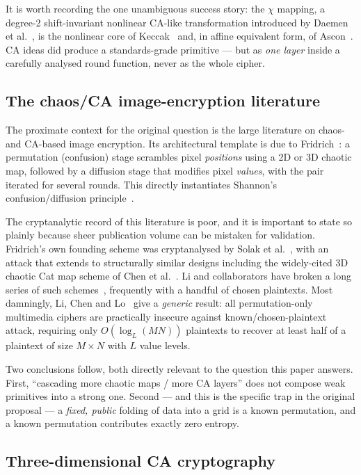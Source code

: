 \documentclass[11pt,a4paper]{article}
\theoremstyle{plain}
\theoremstyle{definition}
\theoremstyle{remark}
\begin{document}
It is worth recording the one unambiguous success story: the $\chi$ mapping, a
degree-2 shift-invariant nonlinear CA-like transformation introduced by Daemen et
al.~\cite{daemen94}, is the nonlinear core of Keccak~\cite{keccak} and, in affine
equivalent form, of Ascon~\cite{asconspec}. CA ideas did produce a
standards-grade primitive --- but as \emph{one layer} inside a carefully analysed
round function, never as the whole cipher.

\subsection{The chaos/CA image-encryption literature}

The proximate context for the original question is the large literature on
chaos- and CA-based image encryption. Its architectural template is due to
Fridrich~\cite{fridrich98}: a permutation (confusion) stage scrambles pixel
\emph{positions} using a 2D or 3D chaotic map, followed by a diffusion stage that
modifies pixel \emph{values}, with the pair iterated for several rounds. This
directly instantiates Shannon's confusion/diffusion principle~\cite{shannon49}.

The cryptanalytic record of this literature is poor, and it is important to state so
plainly because sheer publication volume can be mistaken for validation. Fridrich's
own founding scheme was cryptanalysed by Solak et al.~\cite{solak10}, with an attack
that extends to structurally similar designs including the widely-cited 3D chaotic
Cat map scheme of Chen et al.~\cite{chen2004}. Li and collaborators have broken a
long series of such schemes~\cite{li09compound,li11breaking,li18ieaie,limodified},
frequently with a handful of chosen plaintexts. Most damningly, Li, Chen and
Lo~\cite{lipermonly} give a \emph{generic} result: all permutation-only multimedia
ciphers are practically insecure against known/chosen-plaintext attack, requiring only
$O(\log_L(MN))$ plaintexts to recover at least half of a plaintext of size $M\times N$
with $L$ value levels.

Two conclusions follow, both directly relevant to the question this paper answers.
First, ``cascading more chaotic maps / more CA layers'' does not compose weak
primitives into a strong one. Second --- and this is the specific trap in the original
proposal --- a \emph{fixed, public} folding of data into a grid is a known permutation,
and a known permutation contributes exactly zero entropy.

\subsection{Three-dimensional CA cryptography}
\end{document}
